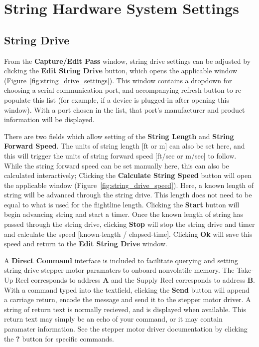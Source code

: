 \documentclass[10pt,letterpaper,titlepage]{article}
\begin{document}
    \newpage

    \section{String Hardware System Settings}
    \label{sec:string_hardware_settings}

    \subsection{String Drive}
    From the \textbf{Capture/Edit Pass} window, string drive settings can be adjusted by clicking the \textbf{Edit String Drive} button, which opens the applicable window (Figure~\ref{fig:string_drive_settings}). This window contains a dropdown for choosing a serial communication port, and accompanying refresh button to re-populate this list (for example, if a device is plugged-in after opening this window). With a port chosen in the list, that port's manufacturer and product information will be displayed.\par
    There are two fields which allow setting of the \textbf{String Length} and \textbf{String Forward Speed}. The units of string length [ft or m] can also be set here, and this will trigger the units of string forward speed [ft/sec or m/sec] to follow. While the string forward speed can be set manually here, this can also be calculated interactively; Clicking the \textbf{Calculate String Speed} button will open the applicable window (Figure~\ref{fig:string_drive_speed}). Here, a known length of string will be advanced through the string drive. This length does not need to be equal to what is used for the flightline length. Clicking the \textbf{Start} button will begin advancing string and start a timer. Once the known length of string has passed through the string drive, clicking \textbf{Stop} will stop the string drive and timer and calculate the speed [known-length / elapsed-time]. Clicking \textbf{Ok} will save this speed and return to the \textbf{Edit String Drive} window.\par
    A \textbf{Direct Command} interface is included to facilitate querying and setting string drive stepper motor paramaters to onboard nonvolatile memory. The Take-Up Reel corresponds to address \textbf{A} and the Supply Reel corresponds to address \textbf{B}. With a command typed into the textfield, clicking the \textbf{Send} button will append a carriage return, encode the message and send it to the stepper motor driver. A string of return text is normally recieved, and is displayed when available. This return text may simply be an echo of your command, or it may contain paramater information. See the stepper motor driver documentation by clicking the \textbf{?} button for specific commands.
\end{document}
